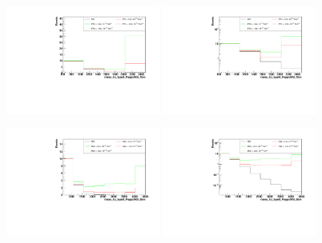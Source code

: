 \begin{figure}[h]
  \begin{center}
	\includegraphics[width=0.45\textwidth]{Plots/aQGC_kinematics/mass_lvj_type0_PuppiAK8_4bin_FT2.pdf}%
	\includegraphics[width=0.45\textwidth]{Plots/aQGC_kinematics/mass_lvj_type0_PuppiAK8_4bin_FT2_log.pdf}\\	
    \caption{}
  \end{center}
\end{figure}
\begin{figure}[h]
  \begin{center}
	\includegraphics[width=0.45\textwidth]{Plots/aQGC_kinematics/mass_lvj_type0_PuppiAK8_8bin_FM0.pdf}%
	\includegraphics[width=0.45\textwidth]{Plots/aQGC_kinematics/mass_lvj_type0_PuppiAK8_8bin_FM0_log.pdf}\\	
    \caption{}
  \end{center}
\end{figure}
